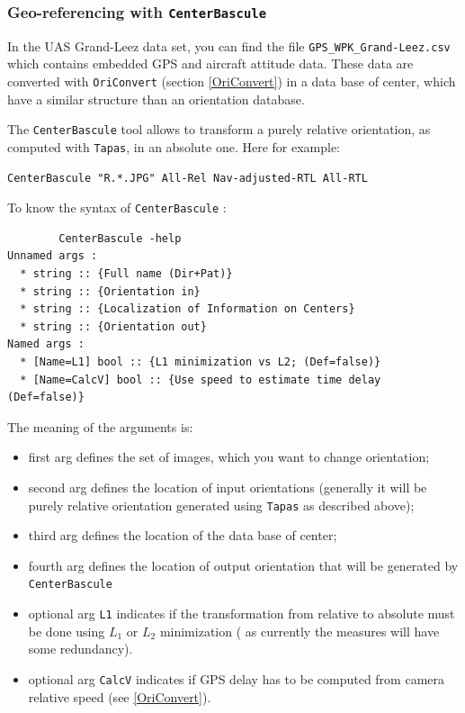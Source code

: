 

\subsubsection{Geo-referencing with {\tt CenterBascule}}\label{Sec:CenterBascule}


In the UAS Grand-Leez data set, you can find the file {\tt GPS\_WPK\_Grand-Leez.csv} which contains embedded GPS and aircraft attitude data. These data are converted with {\tt OriConvert} (section \ref{OriConvert}) in a data base of center, which have a similar structure than an orientation database.

The {\tt CenterBascule} tool allows to transform a purely relative orientation,
as computed with {\tt Tapas}, in an absolute one. Here for example:

\begin{verbatim}
CenterBascule "R.*.JPG" All-Rel Nav-adjusted-RTL All-RTL
\end{verbatim}

To know the syntax of {\tt CenterBascule} :
\begin{verbatim}
        CenterBascule -help
Unnamed args :
  * string :: {Full name (Dir+Pat)}
  * string :: {Orientation in}
  * string :: {Localization of Information on Centers}
  * string :: {Orientation out}
Named args :
  * [Name=L1] bool :: {L1 minimization vs L2; (Def=false)}
  * [Name=CalcV] bool :: {Use speed to estimate time delay (Def=false)}
\end{verbatim}

The meaning of the arguments is:

\begin{itemize}
  \item  first arg defines the set of images, which you want to change orientation;
  \item  second arg defines the location of input orientations (generally it will be purely relative
         orientation generated using {\tt Tapas} as described above);
  \item third arg defines the location of the data base of center;
  \item fourth arg defines the location of output orientation that will be generated by {\tt CenterBascule}
  \item optional arg {\tt L1} indicates if the transformation from relative to absolute
         must be done using $L_1$ or $L_2$ minimization ( as currently the  measures
         will have some redundancy).
        \item optional arg {\tt CalcV} indicates if GPS delay has to be computed from camera relative speed (see \ref{OriConvert}).
\end{itemize}

